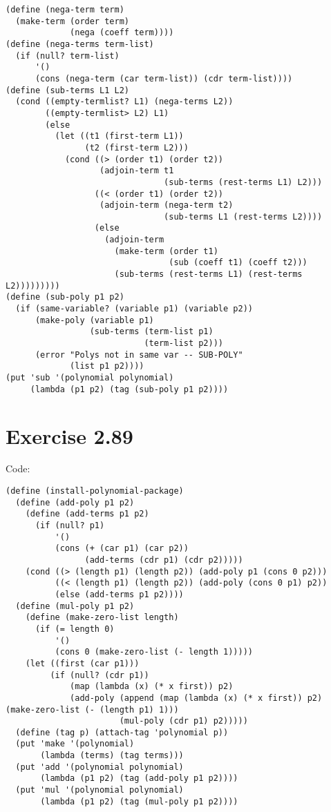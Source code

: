 \documentclass[../main.tex]{subfiles}
\begin{document}
\begin{lstlisting}
(define (nega-term term)
  (make-term (order term)
             (nega (coeff term))))
(define (nega-terms term-list)
  (if (null? term-list)
      '()
      (cons (nega-term (car term-list)) (cdr term-list))))
(define (sub-terms L1 L2)
  (cond ((empty-termlist? L1) (nega-terms L2))
        ((empty-termlist> L2) L1)
        (else
          (let ((t1 (first-term L1))
                (t2 (first-term L2)))
            (cond ((> (order t1) (order t2))
                   (adjoin-term t1
                                (sub-terms (rest-terms L1) L2)))
                  ((< (order t1) (order t2))
                   (adjoin-term (nega-term t2)
                                (sub-terms L1 (rest-terms L2))))
                  (else
                    (adjoin-term
                      (make-term (order t1)
                                 (sub (coeff t1) (coeff t2)))
                      (sub-terms (rest-terms L1) (rest-terms L2)))))))))
(define (sub-poly p1 p2)
  (if (same-variable? (variable p1) (variable p2))
      (make-poly (variable p1)
                 (sub-terms (term-list p1)
                            (term-list p2)))
      (error "Polys not in same var -- SUB-POLY"
             (list p1 p2))))
(put 'sub '(polynomial polynomial)
     (lambda (p1 p2) (tag (sub-poly p1 p2))))
\end{lstlisting}

\section{Exercise 2.89}

Code:

\begin{lstlisting}
(define (install-polynomial-package)
  (define (add-poly p1 p2)
    (define (add-terms p1 p2)
      (if (null? p1)
          '()
          (cons (+ (car p1) (car p2))
                (add-terms (cdr p1) (cdr p2)))))
    (cond ((> (length p1) (length p2)) (add-poly p1 (cons 0 p2)))
          ((< (length p1) (length p2)) (add-poly (cons 0 p1) p2))
          (else (add-terms p1 p2))))
  (define (mul-poly p1 p2)
    (define (make-zero-list length)
      (if (= length 0)
          '()
          (cons 0 (make-zero-list (- length 1)))))
    (let ((first (car p1)))
         (if (null? (cdr p1))
             (map (lambda (x) (* x first)) p2)
             (add-poly (append (map (lambda (x) (* x first)) p2) (make-zero-list (- (length p1) 1)))
                       (mul-poly (cdr p1) p2)))))
  (define (tag p) (attach-tag 'polynomial p))
  (put 'make '(polynomial)
       (lambda (terms) (tag terms)))
  (put 'add '(polynomial polynomial)
       (lambda (p1 p2) (tag (add-poly p1 p2))))
  (put 'mul '(polynomial polynomial)
       (lambda (p1 p2) (tag (mul-poly p1 p2))))
\end{lstlisting}
\end{document}
